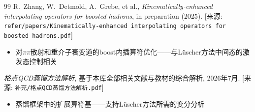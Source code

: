 \documentclass[12pt,a4paper]{ctexart}
\theoremstyle{definition}
\begin{document}
\begin{thebibliography}{99}
R.~Zhang, W.~Detmold, A.~Grebe, et al.,
\textit{Kinematically-enhanced interpolating operators for boosted hadrons},
in preparation (2025).
[来源: \texttt{refer/papers/Kinematically-enhanced interpolating operators for boosted hadrons.pdf}]
\begin{itemize}
    \item 对$\pi\pi$散射和重介子衰变道的boost内插算符优化——与L\"uscher方法中间态的激发态控制相关
\end{itemize}

\textit{格点QCD蒸馏方法解析},
基于本库全部相关文献与教材的综合解析, 2026年7月.
[来源: \texttt{补充/格点QCD蒸馏方法解析.pdf}]
\begin{itemize}
    \item 蒸馏框架中的扩展算符基——支持L\"uscher方法所需的变分分析
\end{itemize}

\end{thebibliography}
\end{document}
